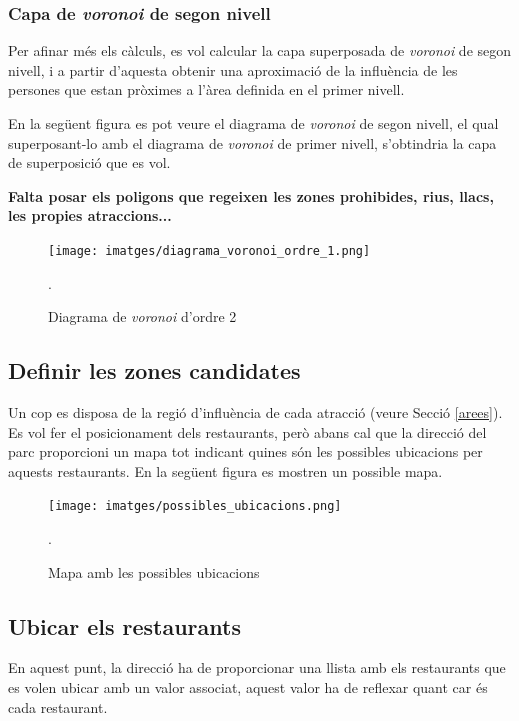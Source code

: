 \documentclass[12pt]{article}
\begin{document}
\subsubsection{Capa de \textit{voronoi} de segon nivell}
Per afinar més els càlculs, es vol calcular la capa superposada de \textit{voronoi} de segon nivell, i a partir d'aquesta obtenir una aproximació de la influència de les persones que estan pròximes a l'àrea definida en el primer nivell.


En la següent figura es pot veure el diagrama de \textit{voronoi} de segon nivell, el qual superposant-lo amb el diagrama de \textit{voronoi} de primer nivell, s'obtindria la capa de superposició que es vol.

\textbf{Falta posar els poligons que regeixen les zones prohibides, rius, llacs, les propies atraccions...}

\begin{figure}[H]
	\centering
	\texttt{[image: imatges/diagrama\_voronoi\_ordre\_1.png]}\par\vspace{1cm}
	\caption{Diagrama de \textit{voronoi} d'ordre 2}.
	\label{fig:diagrama_voronoi_ordre_1}
\end{figure}

\subsection{Definir les zones candidates}
Un cop es disposa de la regió d'influència de cada atracció (veure Secció \ref{arees}). Es vol fer el posicionament dels restaurants, però abans cal que la direcció del parc proporcioni un mapa tot indicant quines són les possibles ubicacions per aquests restaurants. En la següent figura es mostren un possible mapa.

\begin{figure}[H]
	\centering
	\texttt{[image: imatges/possibles\_ubicacions.png]}\par\vspace{1cm}
	\caption{Mapa amb les possibles ubicacions}.
	\label{fig:zones_candidates}
\end{figure}

\subsection{Ubicar els restaurants}
En aquest punt, la direcció ha de proporcionar una llista amb els restaurants que es volen ubicar amb un valor associat, aquest valor ha de reflexar quant car és cada restaurant.
\end{document}
